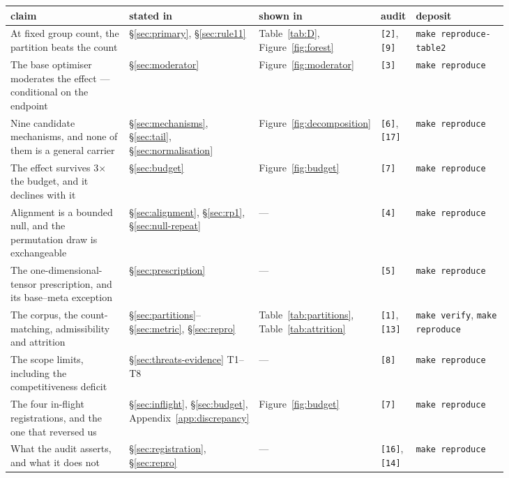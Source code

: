 \documentclass[10pt,letterpaper]{article}
\begin{document}
\begin{center}
\small
\begin{tabular}{@{}>{\raggedright\arraybackslash}p{0.27\linewidth}>{\raggedright\arraybackslash}p{0.15\linewidth}>{\raggedright\arraybackslash}p{0.13\linewidth}>{\raggedright\arraybackslash}p{0.07\linewidth}>{\raggedright\arraybackslash}p{0.21\linewidth}@{}}
\toprule
claim & stated in & shown in & audit & deposit \\
\midrule
At fixed group count, the partition beats the count &
  \S\ref{sec:primary}, \S\ref{sec:rule11} & Table~\ref{tab:D}, Figure~\ref{fig:forest} &
  \texttt{[2]}, \texttt{[9]} & \texttt{make reproduce-table2} \\
The base optimiser moderates the effect --- conditional on the endpoint &
  \S\ref{sec:moderator} & Figure~\ref{fig:moderator} & \texttt{[3]} &
  \texttt{make reproduce} \\
Nine candidate mechanisms, and none of them is a general carrier &
  \S\ref{sec:mechanisms}, \S\ref{sec:tail}, \S\ref{sec:normalisation} &
  Figure~\ref{fig:decomposition} & \texttt{[6]}, \texttt{[17]} & \texttt{make reproduce} \\
The effect survives 3$\times$ the budget, and it declines with it &
  \S\ref{sec:budget} & Figure~\ref{fig:budget} & \texttt{[7]} & \texttt{make reproduce} \\
Alignment is a bounded null, and the permutation draw is exchangeable &
  \S\ref{sec:alignment}, \S\ref{sec:rp1}, \S\ref{sec:null-repeat} & --- & \texttt{[4]} &
  \texttt{make reproduce} \\
The one-dimensional-tensor prescription, and its base--meta exception &
  \S\ref{sec:prescription} & --- & \texttt{[5]} & \texttt{make reproduce} \\
The corpus, the count-matching, admissibility and attrition &
  \S\ref{sec:partitions}--\S\ref{sec:metric}, \S\ref{sec:repro} &
  Table~\ref{tab:partitions}, Table~\ref{tab:attrition} & \texttt{[1]}, \texttt{[13]} &
  \texttt{make verify}, \texttt{make reproduce} \\
The scope limits, including the competitiveness deficit &
  \S\ref{sec:threats-evidence} T1--T8 & --- & \texttt{[8]} & \texttt{make reproduce} \\
The four in-flight registrations, and the one that reversed us &
  \S\ref{sec:inflight}, \S\ref{sec:budget}, Appendix~\ref{app:discrepancy} &
  Figure~\ref{fig:budget} & \texttt{[7]} & \texttt{make reproduce} \\
What the audit asserts, and what it does not &
  \S\ref{sec:registration}, \S\ref{sec:repro} & --- & \texttt{[16]}, \texttt{[14]} &
  \texttt{make reproduce} \\
\bottomrule
\end{tabular}
\end{center}
\end{document}
